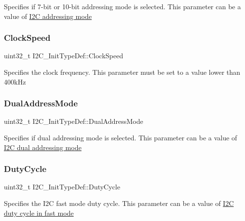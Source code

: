 Specifies if 7-\/bit or 10-\/bit addressing mode is selected. This parameter can be a value of \hyperlink{group___i2_c__addressing__mode}{I2C addressing mode} \mbox{\label{struct_i2_c___init_type_def_a45f1209e7e43e55f055bd9ead064230a}} 
\subsubsection{\texorpdfstring{Clock\+Speed}{ClockSpeed}}
{\footnotesize\ttfamily uint32\+\_\+t I2\+C\+\_\+\+Init\+Type\+Def\+::\+Clock\+Speed}

Specifies the clock frequency. This parameter must be set to a value lower than 400k\+Hz \mbox{\label{struct_i2_c___init_type_def_add6a6b87ee067d33c94c554288736d40}} 
\subsubsection{\texorpdfstring{Dual\+Address\+Mode}{DualAddressMode}}
{\footnotesize\ttfamily uint32\+\_\+t I2\+C\+\_\+\+Init\+Type\+Def\+::\+Dual\+Address\+Mode}

Specifies if dual addressing mode is selected. This parameter can be a value of \hyperlink{group___i2_c__dual__addressing__mode}{I2C dual addressing mode} \mbox{\label{struct_i2_c___init_type_def_a91eb2f998ac771478ec0f44ac73c32dd}} 
\subsubsection{\texorpdfstring{Duty\+Cycle}{DutyCycle}}
{\footnotesize\ttfamily uint32\+\_\+t I2\+C\+\_\+\+Init\+Type\+Def\+::\+Duty\+Cycle}

Specifies the I2C fast mode duty cycle. This parameter can be a value of \hyperlink{group___i2_c__duty__cycle__in__fast__mode}{I2C duty cycle in fast mode} \mbox{\label{struct_i2_c___init_type_def_a17ce92b135a4b5c045a5387c91677803}} 
